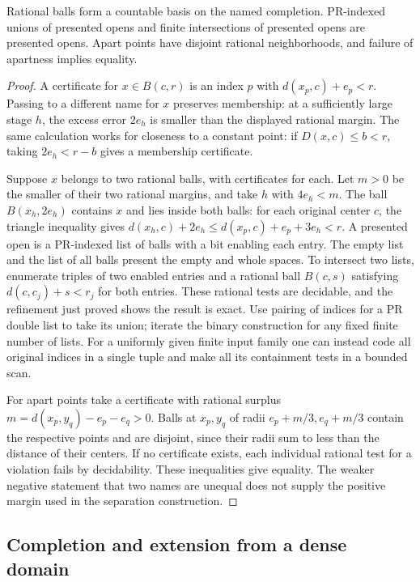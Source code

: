 \begin{proposition}\label{idx-metric51}
Rational balls form a countable basis on the named completion. PR-indexed
unions of presented opens and finite intersections of presented opens are
presented opens. Apart points have disjoint rational neighborhoods, and
failure of apartness implies equality.
\end{proposition}
\begin{proof}
A certificate for $x\in B(c,r)$ is an index $p$ with
$d(x_p,c)+e_p<r$. Passing to a different name for $x$ preserves membership:
at a sufficiently large stage $h$, the excess error $2e_h$ is smaller
than the displayed rational margin. The same calculation works for closeness
to a constant point: if $D(x,c)\le b<r$, taking $2e_h<r-b$ gives a
membership certificate.

Suppose $x$ belongs to two rational balls, with certificates for each.
Let $m>0$ be the smaller of their two rational margins, and take $h$ with
$4e_h<m$. The ball $B(x_h,2e_h)$ contains $x$ and lies inside both balls:
for each original center $c$, the triangle inequality gives
$d(x_h,c)+2e_h\le d(x_p,c)+e_p+3e_h<r$.
A presented open is a PR-indexed list of balls with a bit enabling each
entry. The empty list and the list of all balls present the empty and whole
spaces. To intersect two lists, enumerate triples of two enabled entries
and a rational ball $B(c,s)$ satisfying $d(c,c_j)+s<r_j$ for both entries.
These rational tests are decidable, and the refinement just proved shows the
result is exact. Use pairing of indices for a PR double list to take its union;
iterate the binary construction for any fixed finite number of lists.
For a uniformly given finite input family one can instead code all original
indices in a single tuple and make all its containment tests in a bounded scan.

For apart points take a certificate with rational surplus
$m=d(x_p,y_q)-e_p-e_q>0$. Balls at $x_p,y_q$ of radii $e_p+m/3,e_q+m/3$
contain the respective points and are disjoint, since their radii sum to less
than the distance of their centers. If no certificate exists, each individual
rational test for a violation fails by decidability. These inequalities give
equality. The weaker negative statement that two names are unequal does not
supply the positive margin used in the separation construction.
\end{proof}

\subsection{Completion and extension from a dense domain}

